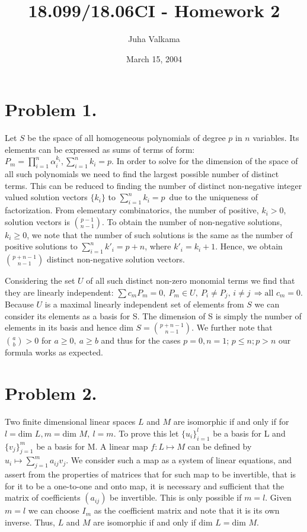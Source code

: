 \documentclass[11pt]{amsart}
\begin{document}
\title{18.099/18.06CI - Homework 2}
\author{Juha Valkama}
\date{March 15, 2004}
\maketitle

\section*{Problem 1.}
Let $S$ be the space of all homogeneous polynomials of degree $p$ in
$n$ variables. Its elements can be expressed as sums of terms of form:
$P_m=\prod_{i=1}^n \alpha_i^{k_i}, \sum_{i=1}^n k_i = p.$ In order to
solve for the dimension of the space of all such polynomials we need
to find the largest possible number of distinct terms. This can be
reduced to finding the number of distinct non-negative integer valued
solution vectors $\{k_i\}$ to $\sum_{i=1}^{n} k_i = p\,$ due to the
uniqueness of factorization. From elementary combinatorics, the number
of positive, $k_i > 0$, solution vectors is $\binom{p-1}{n-1}$. To
obtain the number of non-negative solutions, $k_i \geq 0$, we note
that the number of such solutions is the same as the number of
positive solutions to $\sum_{i=1}^{n} k'_i=p+n$, where $k'_i=k_i+1$.
Hence, we obtain $\binom{p+n-1}{n-1}$ distinct non-negative solution
vectors.

Considering the set $U$ of all such distinct non-zero monomial
terms we find that they are linearly independent: $\sum c_m
P_m=0,\ P_m \in U,\ P_i\neq P_j, \, i \neq j \, \Rightarrow
\textrm{all } c_m = 0.$ Because $U$ is a maximal linearly
independent set of elements from $S$ we can consider its elements
as a basis for S. The dimension of S is simply the number of
elements in its basis and hence dim $S=\binom{p+n-1}{n-1}$. We
further note that $\binom{a}{b}>0$ for
 $a\geq 0 , \ a \geq b$ and thus for the cases $p=0,n=1$;
$p\leq n;p>n$ our formula works as expected.

\section*{Problem 2.}
Two finite dimensional linear spaces $L$ and $M$ are
isomorphic if and only if for $l = \textrm{dim } L, m =
\textrm{dim } M, \ l=m.$ To prove this let $\{u_i\}_{i=1}^{l}$ be
a basis for L and $\{v_j\}_{j=1}^m$ be a basis for M. A linear map
$f : L \mapsto M$ can be defined by $u_i \mapsto \sum_{j=1}^{m}
a_{ij} v_j.$ We consider such a map as a system of linear
equations, and assert from the properties of matrices that for
such map to be invertible, that is for it to be a one-to-one and
onto map, it is necessary and sufficient that the matrix of
coefficients $(a_{ij})$ be invertible. This is only possible if
$m=l$. Given $m=l$ we can choose $I_m$ as the coefficient matrix
and note that it is its own inverse. Thus, $L$ and $M$ are
isomorphic if and only if $\textrm{dim } L = \textrm{dim } M$.
\end{document}
